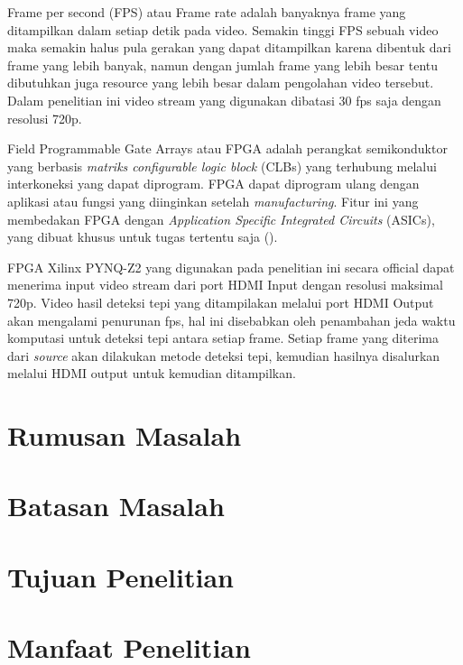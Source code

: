 Frame per second (FPS) atau Frame rate adalah banyaknya frame yang ditampilkan dalam setiap detik pada video. Semakin tinggi FPS sebuah video maka semakin halus pula gerakan yang dapat ditampilkan karena dibentuk dari frame yang lebih banyak, namun dengan jumlah frame yang lebih besar tentu dibutuhkan juga resource yang lebih besar dalam pengolahan video tersebut. Dalam penelitian ini video stream yang digunakan dibatasi 30 fps saja dengan resolusi 720p.


Field Programmable Gate Arrays atau FPGA adalah perangkat semikonduktor yang berbasis \textit{matriks configurable logic block} (CLBs) yang terhubung melalui interkoneksi yang dapat diprogram. FPGA dapat diprogram ulang dengan aplikasi atau fungsi yang diinginkan setelah \textit{manufacturing}. Fitur ini yang membedakan FPGA dengan \textit{Application Specific Integrated Circuits} (ASICs), yang dibuat khusus untuk tugas tertentu saja (\cite{XILINX}).

FPGA Xilinx PYNQ-Z2 yang digunakan pada penelitian ini secara official dapat menerima input video stream dari port HDMI Input dengan resolusi maksimal 720p. Video hasil deteksi tepi yang ditampilakan melalui port HDMI Output akan mengalami penurunan fps, hal ini disebabkan oleh penambahan jeda waktu komputasi untuk deteksi tepi antara setiap frame. Setiap frame yang diterima dari \textit{source} akan dilakukan metode deteksi tepi, kemudian hasilnya disalurkan melalui HDMI output untuk kemudian ditampilkan.



\section{Rumusan Masalah}
\blindtext

\section{Batasan Masalah}
\blindtext

\section{Tujuan Penelitian}
\blindtext

\section{Manfaat Penelitian}
\blindtext




